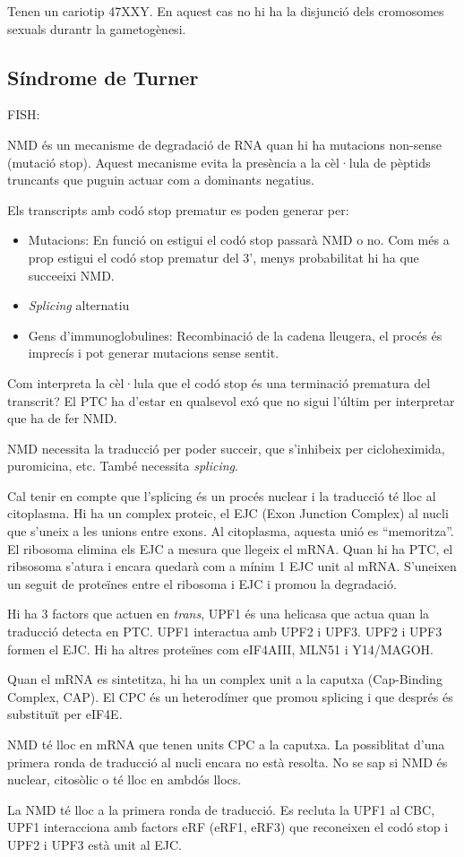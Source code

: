 Tenen un cariotip 47XXY. En aquest cas no hi ha la disjunció dels
cromosomes sexuals durantr la gametogènesi.

\subsection{Síndrome de Turner}
\label{sec:sindrome-de-turner}

FISH: 

NMD és un mecanisme de degradació de RNA quan hi ha mutacions
non-sense (mutació stop). Aquest mecanisme evita la presència a la
cèl·lula de pèptids truncants que puguin actuar com a dominants
negatius.

Els transcripts amb codó stop prematur es poden generar per:
\begin{itemize}
\item Mutacions: En funció on estigui el codó stop passarà NMD o
  no. Com més a prop estigui el codó stop prematur del 3', menys
  probabilitat hi ha que succeeixi NMD.
\item \textit{Splicing} alternatiu
\item Gens d'immunoglobulines: Recombinació de la cadena lleugera, el
  procés és imprecís i pot generar mutacions sense sentit.
\end{itemize}

Com interpreta la cèl·lula que el codó stop és una terminació
prematura del transcrit? El PTC ha d'estar en qualsevol exó que no
sigui l'últim per interpretar que ha de fer NMD.

NMD necessita la traducció per poder succeir, que s'inhibeix per
cicloheximida, puromicina, etc. També necessita \textit{splicing}.

Cal tenir en compte que l'splicing és un procés nuclear i la traducció
té lloc al citoplasma. Hi ha un complex proteic, el EJC (Exon Junction
Complex) al nucli que s'uneix a les unions entre exons. Al citoplasma,
aquesta unió es ``memoritza''. El ribosoma elimina els EJC a mesura
que llegeix el mRNA. Quan hi ha PTC, el ribsosoma s'atura i encara
quedarà com a mínim 1 EJC unit al mRNA. S'uneixen un seguit de
proteïnes entre el ribosoma i EJC i promou la degradació.

Hi ha 3 factors que actuen en \textit{trans}, UPF1 és una helicasa que
actua quan la traducció detecta en PTC. UPF1 interactua amb UPF2 i
UPF3. UPF2 i UPF3 formen el EJC. Hi ha altres proteïnes com eIF4AIII,
MLN51 i Y14/MAGOH.

Quan el mRNA es sintetitza, hi ha un complex unit a la caputxa
(Cap-Binding Complex, CAP). El CPC és un heterodímer que promou
splicing i que després és substituït per eIF4E.

NMD té lloc en mRNA que tenen units CPC a la caputxa. La possiblitat
d'una primera ronda de traducció al nucli encara no està resolta. No
se sap si NMD és nuclear, citosòlic o té lloc en ambdós llocs.

La NMD té lloc a la primera ronda de traducció. Es recluta la UPF1 al
CBC, UPF1 interacciona amb factors eRF (eRF1, eRF3) que reconeixen el
codó stop i UPF2 i UPF3 està unit al EJC.

